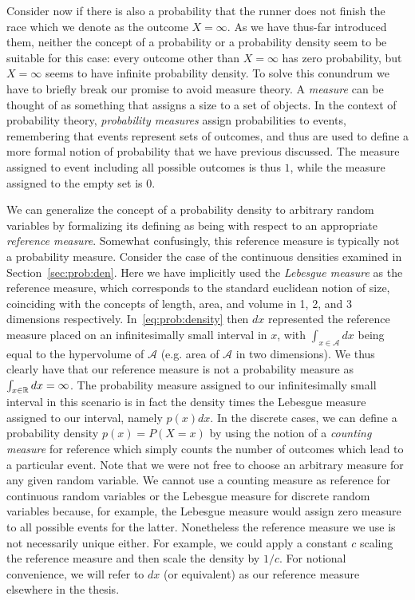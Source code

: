 Consider now if there is also a probability that the runner does not finish the race which
we denote as the outcome $X=\infty$.  As we
have thus-far introduced them, neither the concept of a probability or a probability density
seem to be suitable for this case: every outcome other than $X=\infty$ has zero probability,
but $X=\infty$ seems to have infinite probability density.  To solve this conundrum we 
have to briefly break our promise to avoid measure theory.  A \emph{measure} can be thought of
as something that assigns a size to a set of objects.  In the context of probability theory,
\emph{probability measures} assign probabilities to events, remembering that events represent 
sets of outcomes, and thus are used to define a more formal notion of probability that we have
previous discussed. 
The measure assigned to event including all possible outcomes is thus $1$,
while the measure assigned to the empty set is $0$.  

We can generalize the concept of a probability density to arbitrary random variables
by formalizing its defining as being with respect to an appropriate \emph{reference measure}.  Somewhat confusingly,
this reference measure  is typically not a probability measure.  Consider the case of the continuous densities examined
in Section~\ref{sec:prob:den}.
Here we have implicitly used the \emph{Lebesgue measure} as the reference measure, which corresponds to
the standard euclidean notion of size, coinciding with the concepts of length, area, and
volume in 1, 2, and 3 dimensions respectively.  In~\eqref{eq:prob:density} then $dx$ represented
the reference measure placed on an infinitesimally small interval in $x$, with $\int_{x\in\mathcal{A}} dx$ being equal
to the hypervolume of $\mathcal{A}$ (e.g. area of $\mathcal{A}$ in two dimensions).  We thus
clearly have that our reference measure is not a probability measure as $\int_{x\in\mathbb{R}} dx = \infty$.
The probability measure assigned to our infinitesimally small interval in this scenario
is in fact the density times the Lebesgue measure assigned to our interval, namely $p(x)dx$.
In the discrete cases, we can define a probability density $p(x)=P(X=x)$ by
using the notion of a \emph{counting measure} for reference which simply counts the number of outcomes which
lead to a particular event.   Note that we were not free to choose an arbitrary measure for any given
random variable.  
We cannot use a counting measure as reference for continuous random variables
or the Lebesgue measure for discrete random variables because, for example, the Lebesgue measure would assign zero
measure to all possible events for the latter.  Nonetheless the reference measure we use is not necessarily
unique either.  For example, we could apply a constant $c$ scaling the reference measure and
then scale the density by $1/c$.  For notional convenience, we will refer to $dx$ (or equivalent) 
as our reference measure elsewhere in the thesis.

